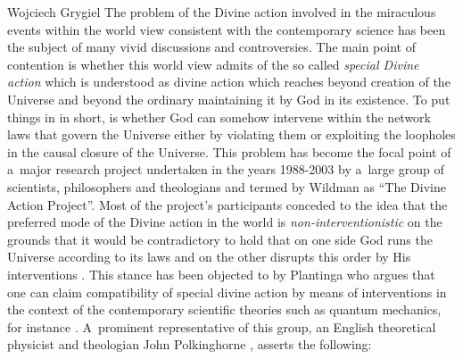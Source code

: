 \begin{artengenv}{Wojciech Grygiel}
The problem of the Divine action involved in the miraculous events within the world view consistent with the contemporary science has been the subject of many vivid discussions and controversies. The main point of contention is whether this world view admits of the so called \textit{special Divine action} which is understood as divine action which reaches beyond creation of the Universe and beyond the ordinary maintaining it by God in its existence. To put things in in short, is whether God can somehow intervene within the network laws that govern the Universe either by violating them or exploiting the loopholes in the causal closure of the Universe. This problem has become the focal point of a~major research project undertaken in the years 1988-2003 by a~large group of scientists, philosophers and theologians and termed by Wildman
\parencite*[][]{wildman_divine_2004} %
 as ``The Divine Action Project''. Most of the project’s participants conceded to the idea that the preferred mode of the Divine action in the world is \textit{non-interventionistic} on the grounds that it would be contradictory to hold that on one side God runs the Universe according to its laws and on the other disrupts this order by His interventions 
\parencites[e.g.][]{peacocke_gods_1995}[][]{russell_divine_2001}. %
 This stance has been objected to by Plantinga who argues that one can claim compatibility of special divine action by means of interventions in the context of the contemporary scientific theories such as quantum mechanics, for instance 
\parencite[][]{plantinga_what_2008}. %
 A~prominent representative of this group, an English theoretical physicist and theologian John Polkinghorne 
\parencite*[][p.92]{polkinghorne_science_1998}, %
 asserts the following:

\end{artengenv}
